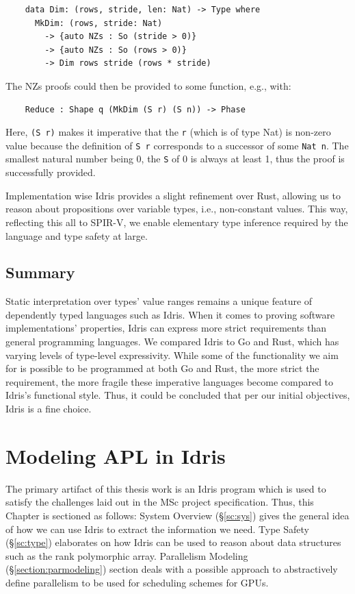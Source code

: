 \documentclass{report}
\begin{document}
\begin{verbatim}
    data Dim: (rows, stride, len: Nat) -> Type where
      MkDim: (rows, stride: Nat)
        -> {auto NZs : So (stride > 0)}
        -> {auto NZs : So (rows > 0)}
        -> Dim rows stride (rows * stride)
\end{verbatim}		
		
The NZs proofs could then be provided to some function, e.g., with: 

\begin{verbatim}
    Reduce : Shape q (MkDim (S r) (S n)) -> Phase
\end{verbatim}

Here, \verb|(S r)| makes it imperative that the \verb|r| (which is of type Nat) is non-zero value because the definition of \verb|S r| corresponds to a successor of some \verb|Nat n|. The smallest natural number being 0, the \verb|S| of 0 is always at least 1, thus the proof is successfully provided.

Implementation wise Idris provides a slight refinement over Rust, allowing us to reason about propositions over variable types, i.e., non-constant values. This way, reflecting this all to SPIR-V, we enable elementary type inference required by the language and type safety at large.

\section*{Summary}

Static interpretation over types' value ranges remains a unique feature of dependently typed languages such as Idris. When it comes to proving software implementations' properties, Idris can express more strict requirements than general programming languages. We compared Idris to Go and Rust, which has varying levels of type-level expressivity. While some of the functionality we aim for is possible to be programmed at both Go and Rust, the more strict the requirement, the more fragile these imperative languages become compared to Idris's functional style. Thus, it could be concluded that per our initial objectives, Idris is a fine choice.

\chapter{Modeling APL in Idris}
\label{ch:contribution}

The primary artifact of this thesis work is an Idris program which is used to satisfy the challenges laid out in the MSc project specification. Thus, this Chapter is sectioned as follows: System Overview (§\ref{sc:sys}) gives the general idea of how we can use Idris to extract the information we need. Type Safety (§\ref{sc:type}) elaborates on how Idris can be used to reason about data structures such as the rank polymorphic array. Parallelism Modeling (§\ref{section:parmodeling}) section deals with a possible approach to abstractively define parallelism to be used for scheduling schemes for GPUs.
\end{document}
